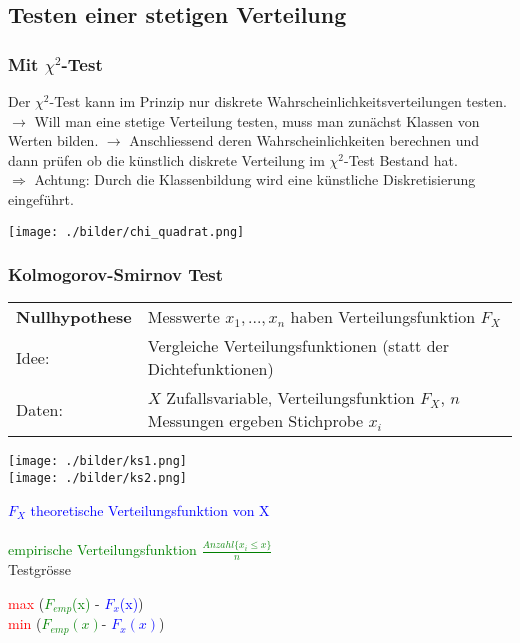   \subsection{Testen einer stetigen Verteilung}
  	\subsubsection{Mit $\chi^2$-Test}
  	\begin{minipage}{13cm}
  		Der $\chi^2$-Test kann im Prinzip nur diskrete Wahrscheinlichkeitsverteilungen testen.\\
  		$\rightarrow$ Will man eine stetige Verteilung testen, muss man zunächst Klassen von Werten bilden. $\rightarrow$ Anschliessend deren Wahrscheinlichkeiten berechnen und dann prüfen ob die künstlich diskrete Verteilung im $\chi^2$-Test Bestand hat.\\
  		$\Rightarrow$ Achtung: Durch die Klassenbildung wird eine künstliche Diskretisierung eingeführt. 
  	\end{minipage}		
  	\begin{minipage}{6.5cm}
  	        \texttt{[image: ./bilder/chi\_quadrat.png]}\\
  	        \end{minipage}
  	        
  	
	\subsubsection{Kolmogorov-Smirnov Test}
	\begin{tabular}{ll}
	\textbf{Nullhypothese} & Messwerte $x_1, ..., x_n$ haben Verteilungsfunktion $F_X$\\
    Idee: & Vergleiche Verteilungsfunktionen (statt der Dichtefunktionen)\\
    Daten: & $X$ Zufallsvariable, Verteilungsfunktion $F_X$, $n$ Messungen
    ergeben Stichprobe $x_i$
    \end{tabular}

	\begin{minipage}{6cm}
    \texttt{[image: ./bilder/ks1.png]}\\
    \texttt{[image: ./bilder/ks2.png]}\\
    \end{minipage}
	\begin{minipage}{12cm}
    \textcolor{blue}{$F_X$ theoretische Verteilungsfunktion von X}\\ \\
    \vspace{15mm}
    \textcolor{green}{empirische Verteilungsfunktion $\frac{Anzahl\{x_i \leq
    x \}}{n}$}\\

    Testgrösse\\
    \hspace*{0.5cm}
    	\parbox{6cm}{\textcolor{red}{max}
   			(\textcolor{green}{$F_{emp}$(x)} - 
   			\textcolor{blue}{$F_x$(x)})\\
    		\textcolor{red}{min} 
    		(\textcolor{green}{$F_{emp}(x)$}-
    		\textcolor{blue}{$F_x(x)$})}

    \end{minipage}

